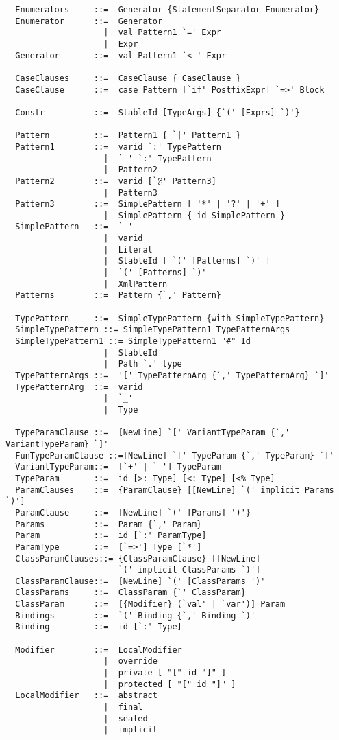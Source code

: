 \begin{lstlisting}
  Enumerators     ::=  Generator {StatementSeparator Enumerator}
  Enumerator      ::=  Generator
                    |  val Pattern1 `=' Expr
                    |  Expr
  Generator       ::=  val Pattern1 `<-' Expr

  CaseClauses     ::=  CaseClause { CaseClause }
  CaseClause      ::=  case Pattern [`if' PostfixExpr] `=>' Block 

  Constr          ::=  StableId [TypeArgs] {`(' [Exprs] `)'}

  Pattern         ::=  Pattern1 { `|' Pattern1 }
  Pattern1        ::=  varid `:' TypePattern
                    |  `_' `:' TypePattern
                    |  Pattern2
  Pattern2        ::=  varid [`@' Pattern3]
                    |  Pattern3
  Pattern3        ::=  SimplePattern [ '*' | '?' | '+' ]
                    |  SimplePattern { id SimplePattern }
  SimplePattern   ::=  `_'
                    |  varid
                    |  Literal
                    |  StableId [ `(' [Patterns] `)' ]
                    |  `(' [Patterns] `)'
                    |  XmlPattern
  Patterns        ::=  Pattern {`,' Pattern}

  TypePattern     ::=  SimpleTypePattern {with SimpleTypePattern}
  SimpleTypePattern ::= SimpleTypePattern1 TypePatternArgs
  SimpleTypePattern1 ::= SimpleTypePattern1 "#" Id
                    |  StableId
                    |  Path `.' type 
  TypePatternArgs ::=  '[' TypePatternArg {`,' TypePatternArg} `]'
  TypePatternArg  ::=  varid 
                    |  `_' 
                    |  Type

  TypeParamClause ::=  [NewLine] `[' VariantTypeParam {`,' VariantTypeParam} `]'
  FunTypeParamClause ::=[NewLine] `[' TypeParam {`,' TypeParam} `]'
  VariantTypeParam::=  [`+' | `-'] TypeParam
  TypeParam       ::=  id [>: Type] [<: Type] [<% Type]
  ParamClauses    ::=  {ParamClause} [[NewLine] `(' implicit Params `)']
  ParamClause     ::=  [NewLine] `(' [Params] ')'} 
  Params          ::=  Param {`,' Param}
  Param           ::=  id [`:' ParamType]
  ParamType       ::=  [`=>'] Type [`*']
  ClassParamClauses::= {ClassParamClause} [[NewLine] 
                       `(' implicit ClassParams `)']
  ClassParamClause::=  [NewLine] `(' [ClassParams ')'
  ClassParams     ::=  ClassParam {`' ClassParam}
  ClassParam      ::=  [{Modifier} (`val' | `var')] Param
  Bindings        ::=  `(' Binding {`,' Binding `)'
  Binding         ::=  id [`:' Type]

  Modifier        ::=  LocalModifier 
                    |  override
                    |  private [ "[" id "]" ] 
                    |  protected [ "[" id "]" ] 
  LocalModifier   ::=  abstract
                    |  final
                    |  sealed
                    |  implicit


\end{lstlisting}
